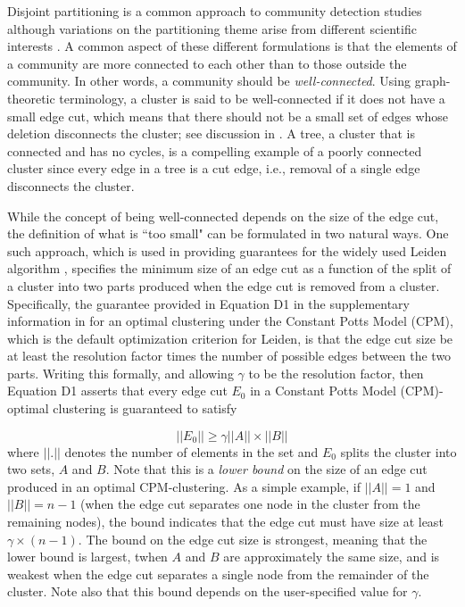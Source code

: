 \documentclass[11pt]{article}   	%
\begin{document}
Disjoint partitioning is a  common approach to community detection studies \citep{Fortunato2022,Fortunato2010} although variations on the partitioning theme arise from different scientific interests \citep{Coscia2011,Schaub2017}.
A common aspect of these different formulations is that  the elements of a community are more connected to each other than to those outside the community. In other words, a community
should be {\em well-connected}.
Using graph-theoretic terminology, a cluster is said to be well-connected if it does not have a small edge cut, which means that there should not be a small set of edges whose deletion
disconnects the cluster; see discussion in \cite{Traag_2019}. A tree, a cluster that is connected and has no cycles, is  a compelling example of a poorly connected cluster since every edge in  a tree is a cut edge, i.e.,  removal of a single edge
disconnects the cluster.

While the concept of being well-connected depends on the size of the edge cut, the definition of what is ``too small" can be formulated in two natural ways. One such  approach, which is used in
providing guarantees for the widely used Leiden algorithm \citep{Traag_2019}, specifies the minimum size of an edge cut as a function of the split  of a cluster into two parts produced
when the edge cut is removed from a cluster. Specifically, the guarantee provided   in Equation D1 in the supplementary information in \cite{Traag_2019} for an optimal clustering under the Constant Potts Model (CPM), which is the default optimization criterion for Leiden, is that the edge cut size be at least the resolution factor   times the number of possible edges between the two  parts. Writing this formally, and allowing $\gamma$ to be the resolution factor, then Equation D1 asserts that every edge cut $E_0$ in a Constant Potts Model (CPM)-optimal clustering is guaranteed to satisfy

 \begin{equation}
 ||E_0|| \geq \gamma ||A|| \times ||B||
 \label{eqn:cpm-bound}
 \end{equation}
where $||.||$ denotes the number of elements in the set and $E_0$ splits the cluster into two sets, $A$ and $B$.
Note that this is a {\em lower bound} on the size of an edge cut produced in an optimal CPM-clustering.
As a simple example, if $||A||=1$ and $||B||=n-1$ (when the edge cut separates one node in the cluster from the remaining nodes),
 the bound indicates that the edge cut must have size at least $\gamma \times (n-1)$.
The bound on the edge cut size  is strongest, meaning that the lower bound is largest, twhen $A$ and $B$ are approximately the same size, and is weakest when the
edge cut separates a single node from the remainder of the cluster. Note also that this bound depends on  the user-specified value for $\gamma$.
\end{document}
